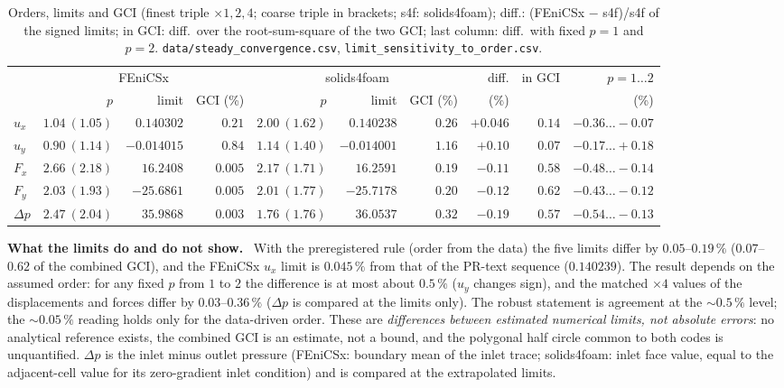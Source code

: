 \documentclass[sn-mathphys,Numbered]{sn-jnl}
\renewcommand{\paragraph}[1]{\par\vspace{0.3\baselineskip}\noindent\textbf{#1}\ }
\newcommand{\FE}{FEniCSx}
\begin{document}
\begin{table}[!ht]
\centering
\caption{Orders, limits and GCI (finest triple $\times1,2,4$; coarse triple in brackets; s4f: solids4foam); diff.: (\FE{} $-$ s4f)/s4f of the signed limits; in GCI: diff.\ over the root-sum-square of the two GCI; last column: diff.\ with fixed $p=1$ and $p=2$. \texttt{data/steady\_convergence.csv}, \texttt{limit\_sensitivity\_to\_order.csv}.}\label{tab:nh_limits}
\footnotesize
\setlength{\tabcolsep}{3pt}
\begin{tabular}{@{}lrrrrrrrrr@{}}
\toprule
 & \multicolumn{3}{c}{\FE{}} & \multicolumn{3}{c}{solids4foam} & diff. & in GCI & $p=1\ldots2$ \\
\cmidrule(r){2-4}\cmidrule(lr){5-7}
 & $p$ & limit & GCI (\%) & $p$ & limit & GCI (\%) & (\%) & & (\%) \\
\midrule
$u_x$ & $1.04\ (1.05)$ & $0.140302$ & $0.21$ & $2.00\ (1.62)$ & $0.140238$ & $0.26$ & $+0.046$ & $0.14$ & $-0.36\ldots-0.07$ \\
$u_y$ & $0.90\ (1.14)$ & $-0.014015$ & $0.84$ & $1.14\ (1.40)$ & $-0.014001$ & $1.16$ & $+0.10$ & $0.07$ & $-0.17\ldots+0.18$ \\
$F_x$ & $2.66\ (2.18)$ & $16.2408$ & $0.005$ & $2.17\ (1.71)$ & $16.2591$ & $0.19$ & $-0.11$ & $0.58$ & $-0.48\ldots-0.14$ \\
$F_y$ & $2.03\ (1.93)$ & $-25.6861$ & $0.005$ & $2.01\ (1.77)$ & $-25.7178$ & $0.20$ & $-0.12$ & $0.62$ & $-0.43\ldots-0.12$ \\
$\Delta p$ & $2.47\ (2.04)$ & $35.9868$ & $0.003$ & $1.76\ (1.76)$ & $36.0537$ & $0.32$ & $-0.19$ & $0.57$ & $-0.54\ldots-0.13$ \\
\bottomrule
\end{tabular}
\end{table}

\paragraph{What the limits do and do not show.}
With the preregistered rule (order from the data) the five limits differ by $0.05$--$0.19\,\%$ ($0.07$--$0.62$ of the combined GCI), and the \FE{} $u_x$ limit is $0.045\,\%$ from that of the PR-text sequence ($0.140239$). The result depends on the assumed order: for any fixed $p$ from $1$ to $2$ the difference is at most about $0.5\,\%$ ($u_y$ changes sign), and the matched $\times4$ values of the displacements and forces differ by $0.03$--$0.36\,\%$ ($\Delta p$ is compared at the limits only). The robust statement is agreement at the $\sim0.5\,\%$ level; the $\sim0.05\,\%$ reading holds only for the data-driven order. These are \emph{differences between estimated numerical limits, not absolute errors}: no analytical reference exists, the combined GCI is an estimate, not a bound, and the polygonal half circle common to both codes is unquantified. $\Delta p$ is the inlet minus outlet pressure (\FE{}: boundary mean of the inlet trace; solids4foam: inlet face value, equal to the adjacent-cell value for its zero-gradient inlet condition) and is compared at the extrapolated limits.
\end{document}
